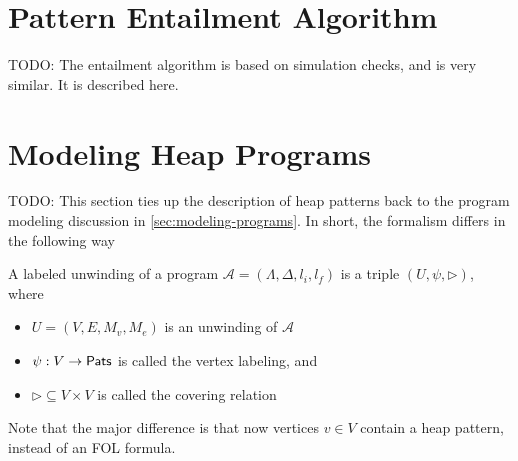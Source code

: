 \section{Pattern Entailment Algorithm}
\label{sec:entailment-algorithm}

TODO: The entailment algorithm is based on simulation checks, and is very similar. It is described here.

\section{Modeling Heap Programs}
\label{sec:modeling-heap-programs}

TODO: This section ties up the description of heap patterns back to the program modeling discussion in \autoref{sec:modeling-programs}. In short, the formalism differs in the following way

\begin{defn}
  \label{defn:labeled-heap-prog-unwinding}
  A labeled unwinding of a program $\mathcal{A} = (\Lambda, \Delta, l_i, l_f)$ is a triple $(U, \psi, \rhd)$, where

  \begin{itemize}
    \item $U = (V, E, M_v, M_e)$ is an unwinding of $\mathcal{A}$
    \item $\psi : V \to \mathsf{Pats}$ is called the vertex labeling, and
    \item $\rhd \subseteq V \times V$ is called the covering relation
  \end{itemize}

  Note that the major difference is that now vertices $v \in V$ contain a heap pattern, instead of an FOL formula.
\end{defn}